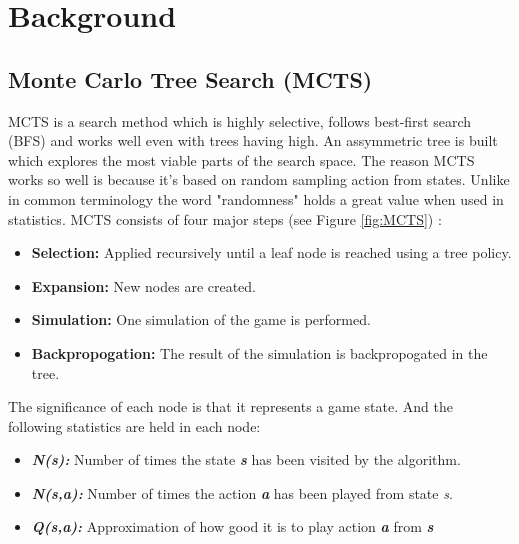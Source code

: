 \documentclass{llncs}
\begin{document}
\section{Background} \label{sec:back}

\subsection{Monte Carlo Tree Search (MCTS)}
MCTS is a search method which is highly selective, follows best-first search (BFS) and works well even with trees having high. An assymmetric tree is built which explores the most viable parts of the search space. The reason MCTS works so well is because it's based on random sampling action from states. Unlike in common terminology the word "randomness" holds a great value when used in statistics. \cite{kendall1938randomness} MCTS consists of four major steps (see Figure \ref{fig:MCTS}) : 


\begin{itemize}

    \item \textbf{Selection:} Applied recursively until a leaf node is reached using a tree policy. 
    
    \item \textbf{Expansion:} New nodes are created.
    
    \item \textbf{Simulation:} One simulation of the game is performed.
    
    \item \textbf{Backpropogation:} The result of the simulation is backpropogated in the tree. 
    
\end{itemize}

\noindent
The significance of each node is that it represents a game state. And the following statistics are held in each node:

\begin{itemize}
    \item \textbf{\emph{N(s):}} Number of times the state \textbf{\emph{s}} has been visited by the algorithm.
    \item \textbf{\emph{N(s,a):}} Number of times the action \textbf{\emph{a}} has been played from state \emph{s}. 
    \item \textbf{\emph{Q(s,a):}} Approximation of how good it is to play action \textbf{\emph{a}} from \textbf{\emph{s}}
\end{itemize}
\end{document}
